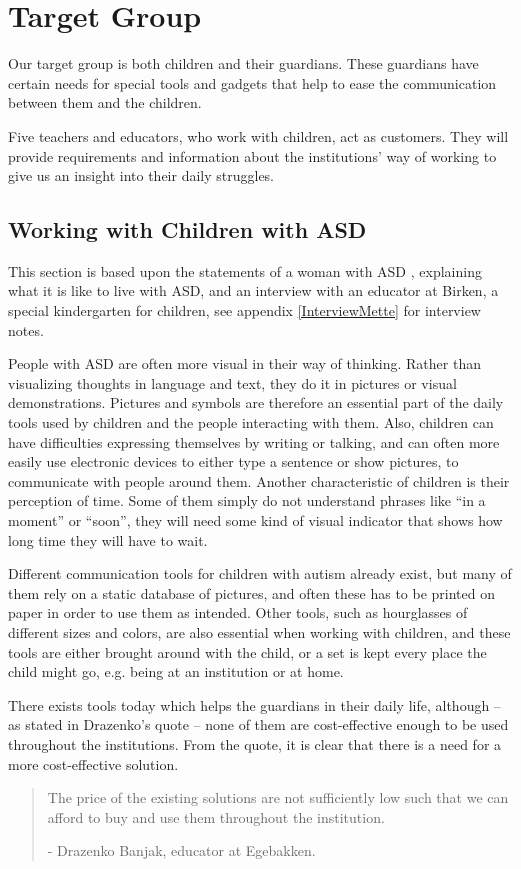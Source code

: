 \section{Target Group}
Our target group is both children and their guardians. These guardians have certain needs for special tools and gadgets that help to ease the communication between them and the children.

Five teachers and educators, who work with children, act as customers. They will provide requirements and information about the institutions' way of working to give us an insight into their daily struggles.

\subsection{Working with Children with ASD}
This section is based upon the statements of a woman with ASD \cite{autism.com}, explaining what it is like to live with ASD, and an interview with an educator at Birken, a special kindergarten for children, see appendix \ref{InterviewMette} for interview notes.

	People with ASD are often more visual in their way of thinking. Rather than visualizing thoughts in language and text, they do it in pictures or visual demonstrations. Pictures and symbols are therefore an essential part of the daily tools used by children and the people interacting with them. Also, children can have difficulties expressing themselves by writing or talking, and can often more easily use electronic devices to either type a sentence or show pictures, to communicate with people around them.
	Another characteristic of children is their perception of time. Some of them simply do not understand phrases like ``in a moment'' or ``soon'', they will need some kind of visual indicator that shows how long time they will have to wait.

Different communication tools for children with autism already exist, but many of them rely on a static database of pictures, and often these has to be printed on paper in order to use them as intended. Other tools, such as hourglasses of different sizes and colors, are also essential when working with children, and these tools are either brought around with the child, or a set is kept every place the child might go, e.g. being at an institution or at home.

There exists tools today which helps the guardians in their daily life, although -- as stated in Drazenko's quote -- none of them are cost-effective enough to be used throughout the institutions. From the quote, it is clear that there is a need for a more cost-effective solution.

\begin{quotation}
The price of the existing solutions are not sufficiently low such that we can afford to buy and use them throughout the institution.\\ 
	\begin{flushright}
		- Drazenko Banjak, educator at Egebakken.
	\end{flushright}
\end{quotation}